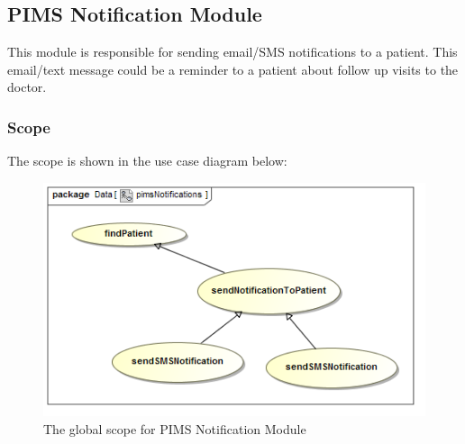 \subsection{PIMS Notification Module}
This module is responsible for sending email/SMS notifications to a patient. This email/text message could be a reminder to a patient about follow up visits to the doctor. \par 

\subsubsection{Scope}
The scope is shown in the use case diagram below: \par
\begin{figure}[H]
	\centerline{\includegraphics[width=0.75\linewidth]{./Functional_Requirements/Graphics/pimsNotification/pimsNotifications}}
	\caption{The global scope for PIMS Notification Module}
\end{figure}

